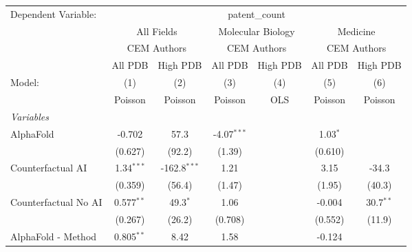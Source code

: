 \begingroup
\centering
\begin{tabular}{lcccccc}
   \tabularnewline \midrule \midrule
   Dependent Variable: & \multicolumn{6}{c}{patent\_count}\\
 & \multicolumn{2}{c}{All Fields} & \multicolumn{2}{c}{Molecular Biology} & \multicolumn{2}{c}{Medicine} \\
\cmidrule(lr){2-3} \cmidrule(lr){4-5} \cmidrule(lr){6-7}
 & \multicolumn{2}{c}{CEM Authors} & \multicolumn{2}{c}{CEM Authors} & \multicolumn{2}{c}{CEM Authors} \\
\cmidrule(lr){2-3} \cmidrule(lr){4-5} \cmidrule(lr){6-7}
 & \multicolumn{1}{c}{All PDB} & \multicolumn{1}{c}{High PDB} & \multicolumn{1}{c}{All PDB} & \multicolumn{1}{c}{High PDB} & \multicolumn{1}{c}{All PDB} & \multicolumn{1}{c}{High PDB} \\
\cmidrule(lr){2-2} \cmidrule(lr){3-3} \cmidrule(lr){4-4} \cmidrule(lr){5-5} \cmidrule(lr){6-6} \cmidrule(lr){7-7}
   Model:                                                     & (1)           & (2)            & (3)           & (4)  & (5)           & (6)\\  
                                                              &  Poisson      & Poisson        & Poisson       & OLS  & Poisson       & Poisson\\  
   \midrule
   \emph{Variables}\\
   AlphaFold                                                  & -0.702        & 57.3           & -4.07$^{***}$ &      & 1.03$^{*}$    &   \\   
                                                              & (0.627)       & (92.2)         & (1.39)        &      & (0.610)       &   \\   
   Counterfactual AI                                          & 1.34$^{***}$  & -162.8$^{***}$ & 1.21          &      & 3.15          & -34.3\\   
                                                              & (0.359)       & (56.4)         & (1.47)        &      & (1.95)        & (40.3)\\   
   Counterfactual No AI                                       & 0.577$^{**}$  & 49.3$^{*}$     & 1.06          &      & -0.004        & 30.7$^{**}$\\   
                                                              & (0.267)       & (26.2)         & (0.708)       &      & (0.552)       & (11.9)\\   
   AlphaFold - Method                                         & 0.805$^{**}$  & 8.42           & 1.58          &      & -0.124        &   \\   

\end{tabular}
